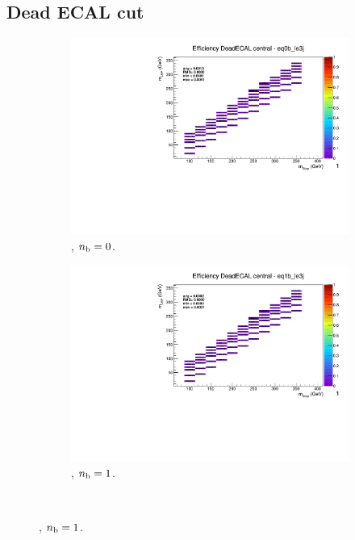 \newpage
\subsection*{Dead ECAL cut}
\label{sec:t2cc_deadecal_plots}

\begin{figure}[h!]
  \centering
  \begin{subfigure}[b]{0.4\textwidth}
    \includegraphics[width=\textwidth, page=5]{Figs/sms/t2cc/v37/systs/T2cc_DeadECAL_eq0b_le3j.pdf}
    \caption{\njlow, $n_{\text{b}} = 0$.}
  \end{subfigure}
  \begin{subfigure}[b]{0.4\textwidth}
    \includegraphics[width=\textwidth, page=5]{Figs/sms/t2cc/v37/systs/T2cc_DeadECAL_eq1b_le3j.pdf}
    \caption{\njlow, $n_{\text{b}} = 1$.}
  \end{subfigure}\\

\end{figure}
